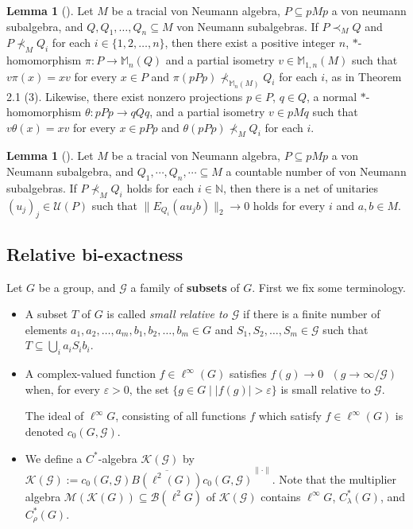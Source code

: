 \documentclass{amsart}
\theoremstyle{definition}
\newtheorem{lemma}[theorem]{Lemma}
\renewcommand{\subset}{\subseteq}
\newcommand{\Mat}{\mathbb{M}}
\begin{document}
\begin{lemma}[\textup{\cite[Remark 3.8]{vaes}}]
Let $M$ be a tracial von Neumann algebra, $P\subset pMp$ a von neumann subalgebra, and $Q, Q_1, \ldots, Q_n\subset M$ von Neumann subalgebras. If $P\prec_M Q$ and $P\nprec_M Q_i$ for each $i\in \{ 1,2,\ldots, n\}$, then 
there exist a positive integer $n$, $\ast$-homomorphism $\pi : P\to \Mat_n(Q)$ and a partial isometry $v\in \Mat_{1,n}(M)$ such that 
$v\pi(x)=xv$ for every $x\in P$ and $\pi(pPp)\nprec_{\Mat_n(M)} Q_i$ for each $i$, as in Theorem 2.1 (3). 
Likewise, there exist nonzero projections $p\in P$, $q\in Q$, a normal $\ast$-homomorphism $\theta:pPp\to qQq$, and a partial isometry $v\in pMq$ such that $v\theta(x)=xv$ for every $x\in pPp$
and $\theta(pPp)\nprec_M Q_i$ for each $i$. 
\end{lemma}

\begin{lemma}[\textup{\cite[Remark 3.3]{vaes}}]
Let $M$ be a tracial von Neumann algebra, $P\subset pMp$ a von Neumann subalgebra, and $Q_1, \cdots, Q_n, \cdots \subset M$ a countable number of von Neumann subalgebras. If $P\nprec_M Q_i$ holds for each $i\in \mathbb{N}$, then there is a net of unitaries $(u_j)_j\in \mathcal{U}(P)$ such that $\| E_{Q_i}(au_jb) \|_2 \to 0$ holds for every $i$ and $a,b\in M$. 
\end{lemma} 





\subsection{Relative bi-exactness}\label{biexact}

Let $G$ be a group, and $\mathcal{G}$ a family of \textbf{subsets} of $G$. 
First we fix some terminology.
\begin{itemize} 

\item A subset $T$ of $G$ is called \emph{small relative to $\mathcal{G}$} if there is a finite number of elements $a_1, a_2, \ldots, a_m, b_1, b_2, \ldots, b_m\in G$ and $S_1, S_2, \ldots , S_m\in \mathcal{G}$ such that $T\subset \bigcup_i a_iS_ib_i$. 

\item A complex-valued function $f\in \ell^{\infty}(G)$ 
satisfies $f(g)\to 0 \text{ } (g\to \infty / \mathcal{G})$ when, 
for every $\varepsilon > 0$, the set 
$\{ g\in G \mid |f(g)|>\varepsilon \}$
is small relative to $\mathcal{G}$. 

The ideal of $\ell^{\infty} G$, consisting of all functions $f$ which satisfy $f\in \ell^{\infty}(G)$ 
is denoted $c_0(G, \mathcal{G})$. 

\item We define a $C^{\ast}$-algebra $\mathcal{K}(\mathcal{G})$ by 
$\mathcal{K}(\mathcal{G}):=\overline{c_0(G, \mathcal{G})B(\ell^2(G))c_0(G, \mathcal{G})}^{\|\cdot\|}$. 
Note that the multiplier algebra $\mathcal{M}(\mathcal{K}(G))\subset \mathcal{B}(\ell^2 G)$ of $\mathcal{K}(\mathcal{G})$ contains $\ell^{\infty} G$, $C^{\ast}_{\lambda}(G)$, and $C^{\ast}_{\rho}(G)$. 
\end{itemize}
\end{document}
